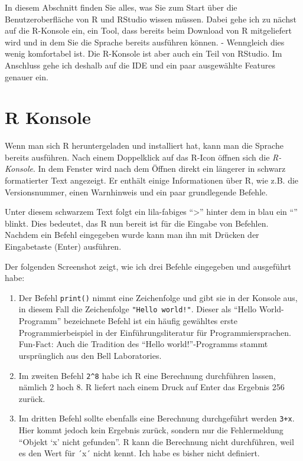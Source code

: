 \documentclass[
]{book}
\begin{document}
In diesem Abschnitt finden Sie alles, was Sie zum Start über die Benutzeroberfläche von R und RStudio wissen müssen. Dabei gehe ich zu nächst auf die R-Konsole ein, ein Tool, dass bereits beim Download von R mitgeliefert wird und in dem Sie die Sprache bereits ausführen können. - Wenngleich dies wenig komfortabel ist. Die R-Konsole ist aber auch ein Teil von RStudio. Im Anschluss gehe ich deshalb auf die IDE und ein paar ausgewählte Features genauer ein.

\hypertarget{konsole}{%
\section{R Konsole}\label{konsole}}

Wenn man sich R heruntergeladen und installiert hat, kann man die Sprache bereits ausführen.
Nach einem Doppelklick auf das R-Icon öffnen sich die \emph{R-Konsole}.
In dem Fenster wird nach dem Öffnen direkt ein längerer in schwarz formatierter Text angezeigt.
Er enthält einige Informationen über R, wie z.B. die Versionsnummer, einen Warnhinweis und ein paar grundlegende Befehle.

Unter diesem schwarzem Text folgt ein lila-fabiges ``\textgreater{}'' hinter dem in blau ein ``\textbar{}'' blinkt.
Dies bedeutet, das R nun bereit ist für die Eingabe von Befehlen. Nachdem ein Befehl eingegeben wurde kann man ihn mit Drücken der Eingabetaste (Enter) ausführen.

Der folgenden Screenshot zeigt, wie ich drei Befehle eingegeben und ausgeführt habe:

\begin{enumerate}
\def\labelenumi{\arabic{enumi}.}
\item
  Der Befehl \texttt{print()} nimmt eine Zeichenfolge und gibt sie in der Konsole aus, in diesem Fall die Zeichenfolge \texttt{"Hello\ world!"}.
  Dieser als ``Hello World-Programm'' bezeichnete Befehl ist ein häufig gewähltes erste Programmierbeispiel in der Einführungsliteratur für Programmiersprachen. Fun-Fact: Auch die Tradition des ``Hello world!''-Programms stammt ursprünglich aus den Bell Laboratories.
\item
  Im zweiten Befehl \texttt{2\^{}8} habe ich R eine Berechnung durchführen lassen, nämlich 2 hoch 8.
  R liefert nach einem Druck auf Enter das Ergebnis 256 zurück.
\item
  Im dritten Befehl sollte ebenfalls eine Berechnung durchgeführt werden \texttt{3+x}.
  Hier kommt jedoch kein Ergebnis zurück, sondern nur die Fehlermeldung ``Objekt `x' nicht gefunden''.
  R kann die Berechnung nicht durchführen, weil es den Wert für ´x´ nicht kennt.
  Ich habe es bisher nicht definiert.
\end{enumerate}
\end{document}
